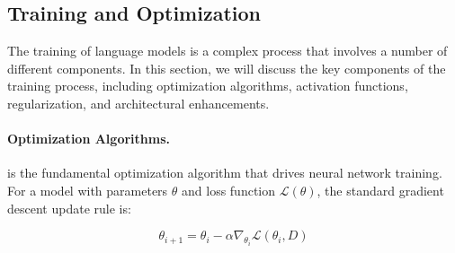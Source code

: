 

\subsection{Training and Optimization}
\label{sec:optimization}

The training of language models is a complex process that involves a number of different components. In this section, we will discuss the key components of the training process, including optimization algorithms, activation functions, regularization, and architectural enhancements.

\paragraph{Optimization Algorithms.} 

 is the fundamental optimization algorithm that drives neural network training. For a model with parameters $\theta$ and loss function $\mathcal{L}(\theta)$, the standard gradient descent update rule is:

\begin{equation}
    \theta_{i+1} = \theta_i - \alpha \nabla_{\theta_i} \mathcal{L}(\theta_i, D)
\end{equation}

